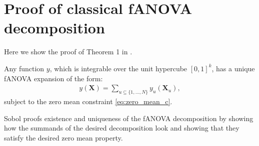 \section*{Proof of classical fANOVA decomposition}
Here we show the proof of Theorem 1 in \cite{sobol1993sensitivity}.
\begin{theorem}
    Any function $y$, which is integrable over the unit hypercube $[0, 1]^k$, has a unique fANOVA expansion of the form:
    \begin{align}
        y(\boldsymbol{X}) = \sum_{u \subseteq \{1, \dots, N\}} y_{u}(\boldsymbol{X}_u),
    \end{align}
    subject to the zero mean constraint \autoref{eq:zero_mean_c}.
\end{theorem}
Sobol proofs existence and uniqueness of the fANOVA decomposition by showing how the summands of the desired decomposition look and showing that they satisfy the desired zero mean property.

